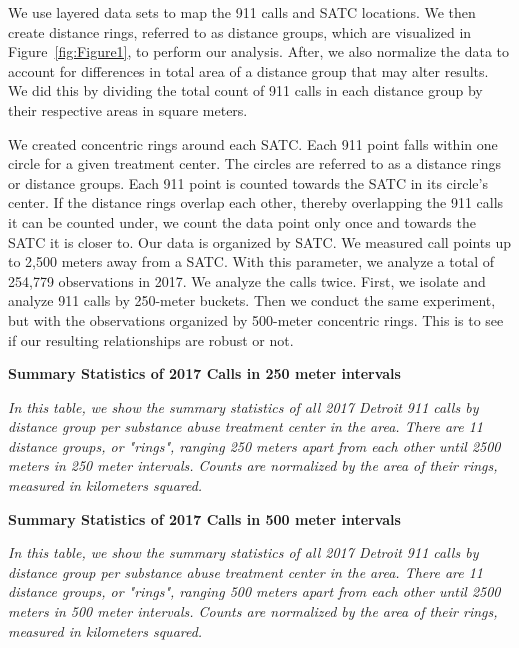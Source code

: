 \documentclass[12pt]{article}
\begin{document}
We use layered data sets to map the 911 calls and SATC locations. We then create distance rings, referred to as distance groups, which are visualized in Figure~\ref{fig:Figure1}, to perform our analysis. After, we also normalize the data to account for differences in total area of a distance group that may alter results. We did this by dividing the total count of 911 calls in each distance group by their respective areas in square meters.

We created concentric rings around each SATC. Each 911 point falls within one circle for a given treatment center.  The circles are referred to as a distance rings or distance groups. Each 911 point is counted towards the SATC in its circle's center. If the distance rings overlap each other, thereby overlapping the 911 calls it can be counted under, we count the data point only once and towards the SATC it is closer to. Our data is organized by SATC. We measured call points up to 2,500 meters away from a SATC. With this parameter, we analyze a total of 254,779 observations in 2017. We analyze the calls twice. First, we isolate and analyze 911 calls by 250-meter buckets. Then we conduct the same experiment, but with the observations organized by 500-meter concentric rings. This is to see if our resulting  relationships are robust or not. 
\begin{table}[h]
\centering
\scalebox{0.8}{
\centering

}
\caption{\textbf{Summary Statistics of 2017 Calls in 250 meter intervals}}
\label{tabl:Table}
\centering\textit{In this table, we show the summary statistics of all 2017 Detroit 911 calls by distance group per substance abuse treatment center in the area. There are 11 distance groups, or "rings", ranging 250 meters apart from each other until 2500 meters in 250 meter intervals. Counts are normalized by the area of their rings, measured in kilometers squared. }
\end{table}

\begin{table}[h]
\centering
\scalebox{0.8}
\centering

\caption{\textbf{Summary Statistics of 2017 Calls in 500 meter intervals}}
\label{tabl:Table}
\centering\textit{In this table, we show the summary statistics of all 2017 Detroit 911 calls by distance group per substance abuse treatment center in the area. There are 11 distance groups, or "rings", ranging 500 meters apart from each other until 2500 meters in 500 meter intervals. Counts are normalized by the area of their rings, measured in kilometers squared. }
\end{table}
\end{document}

